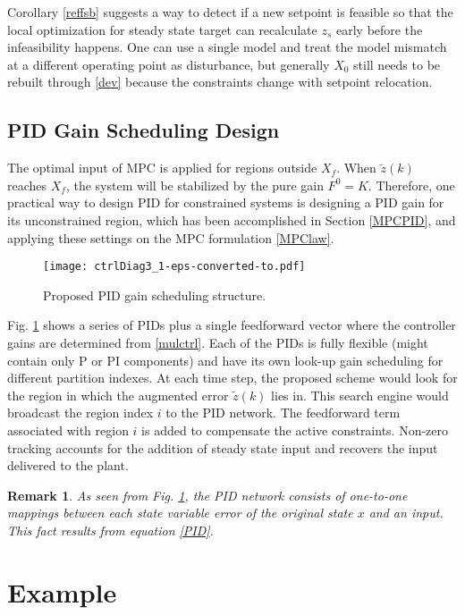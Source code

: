 \documentclass[5p,authoryear,times]{elsarticle}
\newtheorem{rmk}{Remark}
\begin{document}
Corollary \ref{reffsb} suggests a way to detect if a new setpoint is feasible so that the local optimization for steady state target can recalculate $z_s$ early before the infeasibility happens. One can use a single model and treat the model mismatch at a different operating point as disturbance, but generally $X_0$ still needs to be rebuilt through \eqref{dev} because the constraints change with setpoint relocation.



\subsection{PID Gain Scheduling Design}
The optimal input of MPC is applied for regions outside $X_f$. When $\tilde{z}(k)$ reaches $X_f$, the system will be stabilized by the pure gain $F^0=K$. Therefore, one practical way to design PID for constrained systems is designing a PID gain for its unconstrained region, which has been accomplished in Section \ref{MPCPID}, and applying these settings on the MPC formulation \eqref{MPClaw}.

\begin{figure}[t]
\centering
\texttt{[image: ctrlDiag3\_1-eps-converted-to.pdf]}
\caption{Proposed PID gain scheduling structure.}
\label{ctrlDiag3}
\end{figure}

Fig. \ref{ctrlDiag3} shows a series of PIDs plus a single feedforward vector where the controller gains are determined from \eqref{mulctrl}. Each of the PIDs is fully flexible (might contain only P or PI components) and have its own look-up gain scheduling for different partition indexes. At each time step, the proposed scheme would look for the region in which the augmented error $\tilde{z}(k)$ lies in. This search engine would broadcast the region index $i$ to the PID network. The feedforward term associated with region $i$ is added to compensate the active constraints. Non-zero tracking accounts for the addition of steady state input and recovers the input delivered to the plant.

\begin{rmk}
As seen from Fig. \ref{ctrlDiag3}, the PID network consists of one-to-one mappings between each state variable error of the original state $x$ and an input. This fact results from equation \eqref{PID}.
\end{rmk}



\section{Example}
\end{document}
